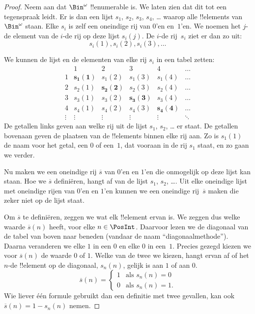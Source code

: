 \documentclass[../../../include/open-logic-section]{subfiles}
\begin{document}
\begin{proof}
Neem aan dat $\Bin^\omega$ !!{enumerable} is. We laten zien dat dit tot
een tegenspraak leidt. Er is dan een lijst $s_{1}$, $s_{2}$,
$s_{3}$, $s_{4}$, \dots{} waarop alle !!{element}s van~$\Bin^\omega$
staan. Elke $s_i$ is zelf een oneindige rij van $0$'en en~$1$'en. We
noemen het $j$-de element van de $i$-de rij op deze lijst $s_i(j)$. De
$i$-de rij~$s_i$ ziet er dan zo uit:
\[
s_i(1), s_i(2), s_i(3), \dots
\]

We kunnen de lijst en de elementen van elke rij $s_i$ in een tabel
zetten:
\[
\begin{array}{c|c|c|c|c|c}
& 1 & 2 & 3 & 4 & \dots \\\hline
1 & \mathbf{s_{1}(1)} & s_{1}(2) & s_{1}(3) & s_1(4) & \dots \\\hline
2 & s_{2}(1)& \mathbf{s_{2}(2)} & s_2(3) & s_2(4) & \dots \\\hline
3 & s_{3}(1)& s_{3}(2) & \mathbf{s_3(3)} & s_3(4) & \dots \\\hline
4 & s_{4}(1)& s_{4}(2) & s_4(3) & \mathbf{s_4(4)} & \dots \\\hline
\vdots & \vdots & \vdots & \vdots & \vdots & \mathbf{\ddots}
\end{array}
\]
De getallen links geven aan welke rij uit de lijst $s_1$, $s_2$,
\dots{} er staat. De getallen bovenaan geven de plaatsen van de
!!{element}s binnen elke rij aan. Zo is $s_{1}(1)$ de naam voor het
getal, een $0$ of een~$1$, dat vooraan in de rij $s_{1}$ staat, en zo
gaan we verder.

Nu maken we een oneindige rij $\overline{s}$ van $0$'en en $1$'en die
onmogelijk op deze lijst kan staan. Hoe we $\overline{s}$ definiëren,
hangt af van de lijst $s_1$, $s_2$, \dots. Uit elke oneindige lijst met
oneindige rijen van $0$'en en $1$'en kunnen we een oneindige
rij~$\overline{s}$ maken die zeker niet op de lijst staat.

Om $\overline{s}$ te definiëren, zeggen we wat elk !!{element} ervan
is. We zeggen dus welke waarde $\overline{s}(n)$ heeft, voor elke $n \in
\PosInt$. Daarvoor lezen
we de diagonaal van de tabel van boven naar beneden (vandaar de naam
``diagonaalmethode''). Daarna veranderen we elke $1$ in een $0$ en elke
$0$ in een~$1$. Precies gezegd kiezen we voor $\overline{s}(n)$ de
waarde $0$ of $1$. Welke van de twee we kiezen, hangt ervan af of het
$n$-de !!{element} op de diagonaal, $s_n(n)$, gelijk is aan $1$ of aan
$0$.
\[
\overline{s}(n) =
\begin{cases}
1 & \text{als $s_{n}(n) = 0$}\\
0 & \text{als $s_{n}(n) = 1$}.
\end{cases}
\]
Wie liever één formule gebruikt dan een definitie met twee gevallen,
kan ook $\overline{s}(n) = 1 - s_n(n)$ nemen.


\end{proof}
\end{document}
